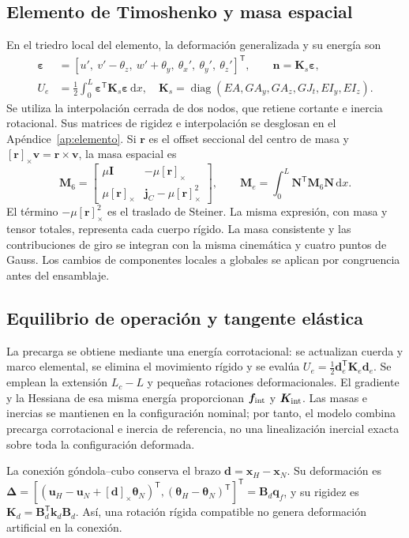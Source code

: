 \documentclass[oneside,a4paper,spanish,links,pagenumbers]{amca}
\newcommand{\Sx}[1]{[\bm{#1}]_\times}
\newcommand{\I}{\bm I}
\newcommand{\dd}{\mathrm d}
\newcommand{\tr}{\mathsf T}
\newcommand{\diag}{\operatorname{diag}}
\begin{document}
\subsection{Elemento de Timoshenko y masa espacial}
En el triedro local del elemento, la deformación generalizada y su energía son
\begin{align}
 \bm\varepsilon&=[u',\ v'-\theta_z,\ w'+\theta_y,\ \theta_x',\ \theta_y',\ \theta_z']^\tr,
 \qquad \bm n=\bm K_s\bm\varepsilon,\\
 U_e&=\tfrac12\int_0^L\bm\varepsilon^\tr\bm K_s\bm\varepsilon\,\dd x,
 \quad \bm K_s=\diag(EA,GA_y,GA_z,GJ_t,EI_y,EI_z).
\end{align}
Se utiliza la interpolación cerrada de dos nodos, que retiene cortante e inercia rotacional. Sus matrices de rigidez e interpolación se desglosan en el Apéndice~\ref{ap:elemento}. Si $\bm r$ es el offset seccional del centro de masa y $\Sx r\bm v=\bm r\times\bm v$, la masa espacial es
\begin{equation}
 \bm M_6=\begin{bmatrix}
 \mu\I&-\mu\Sx r\\ \mu\Sx r&\bm j_C-\mu\Sx r^2
 \end{bmatrix},\qquad
 \bm M_e=\int_0^L\bm N^\tr\bm M_6\bm N\,\dd x.
 \label{eq:masa6}
\end{equation}
El término $-\mu\Sx r^2$ es el traslado de Steiner. La misma expresión, con masa y tensor totales, representa cada cuerpo rígido. La masa consistente y las contribuciones de giro se integran con la misma cinemática y cuatro puntos de Gauss. Los cambios de componentes locales a globales se aplican por congruencia antes del ensamblaje.

\subsection{Equilibrio de operación y tangente elástica}
La precarga se obtiene mediante una energía corrotacional: se actualizan cuerda y marco elemental, se elimina el movimiento rígido y se evalúa $U_e=\tfrac12\bm d_e^\tr\bm K_e\bm d_e$. Se emplean la extensión $L_c-L$ y pequeñas rotaciones deformacionales. El gradiente y la Hessiana de esa misma energía proporcionan $\bm f_{\rm int}$ y $\bm K_{\rm int}$. Las masas e inercias se mantienen en la configuración nominal; por tanto, el modelo combina precarga corrotacional e inercia de referencia, no una linealización inercial exacta sobre toda la configuración deformada.

La conexión góndola--cubo conserva el brazo $\bm d=\bm x_H-\bm x_N$. Su deformación es $\bm\Delta=[(\bm u_H-\bm u_N+\Sx d\bm\theta_N)^\tr,(\bm\theta_H-\bm\theta_N)^\tr]^\tr=\bm B_d\bm q_f$, y su rigidez es $\bm K_d=\bm B_d^\tr\bm k_d\bm B_d$. Así, una rotación rígida compatible no genera deformación artificial en la conexión.
\end{document}

